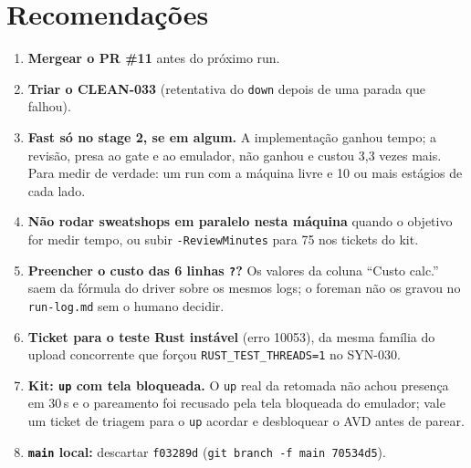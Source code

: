 \documentclass[11pt,a4paper]{article}
\begin{document}
\section{Recomendações}
\begin{enumerate}
  \item \textbf{Mergear o PR \#11} antes do próximo run.
  \item \textbf{Triar o CLEAN-033} (retentativa do \texttt{down} depois de uma
        parada que falhou).
  \item \textbf{Fast só no stage 2, se em algum.} A implementação ganhou
        tempo; a revisão, presa ao gate e ao emulador, não ganhou e custou
        3,3 vezes mais. Para medir de verdade: um run com a máquina livre e
        10 ou mais estágios de cada lado.
  \item \textbf{Não rodar sweatshops em paralelo nesta máquina} quando o
        objetivo for medir tempo, ou subir \texttt{-ReviewMinutes} para 75
        nos tickets do kit.
  \item \textbf{Preencher o custo das 6 linhas \texttt{?}?} Os valores da
        coluna ``Custo calc.'' saem da fórmula do driver sobre os mesmos
        logs; o foreman não os gravou no \texttt{run-log.md} sem o humano
        decidir.
  \item \textbf{Ticket para o teste Rust instável} (erro 10053), da mesma
        família do upload concorrente que forçou
        \texttt{RUST\_TEST\_THREADS=1} no SYN-030.
  \item \textbf{Kit: \texttt{up} com tela bloqueada.} O \texttt{up} real da
        retomada não achou presença em 30\,s e o pareamento foi recusado pela
        tela bloqueada do emulador; vale um ticket de triagem para o
        \texttt{up} acordar e desbloquear o AVD antes de parear.
  \item \textbf{\texttt{main} local:} descartar \texttt{f03289d}
        (\texttt{git branch -f main 70534d5}).
\end{enumerate}
\end{document}
